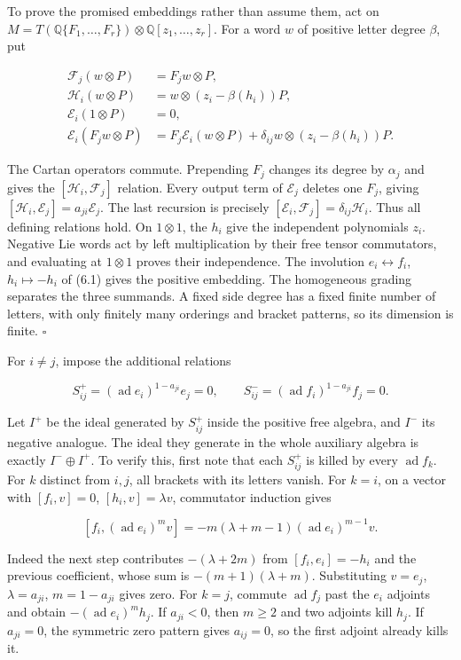 \documentclass[11pt,a4paper,openany]{report}
\begin{document}
To prove the promised embeddings rather than assume them, act on \(M=T(\mathbb Q\{F_1,\ldots,F_r\})\otimes\mathbb Q[z_1,\ldots,z_r]\). For a word \(w\) of positive letter degree \(\beta\), put

\[
\begin{aligned}
\mathcal F_j(w\otimes P)&=F_jw\otimes P,\\
\mathcal H_i(w\otimes P)&=w\otimes(z_i-\beta(h_i))P,\\
\mathcal E_i(1\otimes P)&=0,\\
\mathcal E_i(F_jw\otimes P)&=F_j\mathcal E_i(w\otimes P)
+\delta_{ij}w\otimes(z_i-\beta(h_i))P.
\end{aligned}
\tag{6.3}
\]

The Cartan operators commute. Prepending \(F_j\) changes its degree by \(\alpha_j\) and gives the \([\mathcal H_i,\mathcal F_j]\) relation. Every output term of \(\mathcal E_j\) deletes one \(F_j\), giving \([\mathcal H_i,\mathcal E_j]=a_{ji}\mathcal E_j\). The last recursion is precisely \([\mathcal E_i,\mathcal F_j]=\delta_{ij}\mathcal H_i\). Thus all defining relations hold. On \(1\otimes1\), the \(h_i\) give the independent polynomials \(z_i\). Negative Lie words act by left multiplication by their free tensor commutators, and evaluating at \(1\otimes1\) proves their independence. The involution \(e_i\leftrightarrow f_i\), \(h_i\mapsto-h_i\) of (6.1) gives the positive embedding. The homogeneous grading separates the three summands. A fixed side degree has a fixed finite number of letters, with only finitely many orderings and bracket patterns, so its dimension is finite. \(\square\)

For \(i\ne j\), impose the additional relations

\[
S_{ij}^+=(\operatorname{ad}e_i)^{1-a_{ji}}e_j=0,
\qquad S_{ij}^-=(\operatorname{ad}f_i)^{1-a_{ji}}f_j=0.
\tag{6.4}
\]

Let \(I^+\) be the ideal generated by \(S_{ij}^+\) inside the positive free algebra, and \(I^-\) its negative analogue. The ideal they generate in the whole auxiliary algebra is exactly \(I^-\oplus I^+\). To verify this, first note that each \(S_{ij}^+\) is killed by every \(\operatorname{ad}f_k\). For \(k\) distinct from \(i,j\), all brackets with its letters vanish. For \(k=i\), on a vector with \([f_i,v]=0\), \([h_i,v]=\lambda v\), commutator induction gives

\[
[f_i,(\operatorname{ad}e_i)^m v]
=-m(\lambda+m-1)(\operatorname{ad}e_i)^{m-1}v.
\tag{6.5}
\]

Indeed the next step contributes \(-(\lambda+2m)\) from \([f_i,e_i]=-h_i\) and the previous coefficient, whose sum is \(-(m+1)(\lambda+m)\). Substituting \(v=e_j\), \(\lambda=a_{ji}\), \(m=1-a_{ji}\) gives zero. For \(k=j\), commute \(\operatorname{ad}f_j\) past the \(e_i\) adjoints and obtain \(-(\operatorname{ad}e_i)^m h_j\). If \(a_{ji}<0\), then \(m\ge2\) and two adjoints kill \(h_j\). If \(a_{ji}=0\), the symmetric zero pattern gives \(a_{ij}=0\), so the first adjoint already kills it.
\end{document}
